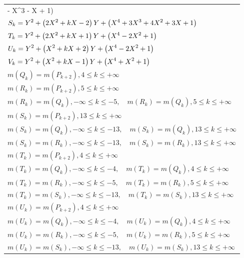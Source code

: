 \documentclass{amsart}
\begin{document}
\begin{longtable}{|l|}
 - X^3
 - X
 + 1\right) \)\\
\(\displaystyle S_k=Y^2
 + \left(2\*X^2
 + k\*X
 - 2\right) \*Y
 + \left(X^4
 + 3\*X^3
 + 4\*X^2
 + 3\*X
 + 1\right) \)\\
\(\displaystyle T_k=Y^2
 + \left(2\*X^2
 + k\*X
 + 1\right) \*Y
 + \left(X^4
 - 2\*X^2
 + 1\right) \)\\
\(\displaystyle U_k=Y^2
 + \left(X^2
 + k\*X
 + 2\right) \*Y
 + \left(X^4
 - 2\*X^2
 + 1\right) \)\\
\(\displaystyle V_k=Y^2
 + \left(X^2
 + k\*X
 - 1\right) \*Y
 + \left(X^4
 + X^2
 + 1\right) \)\\
\(\displaystyle m(Q_k) = m(P_{k
 + 2}),4 \leqslant k \leqslant +\infty\)\\
\(\displaystyle m(R_k) = m(P_{k
 + 2}),5 \leqslant k \leqslant +\infty\)\\
\(\displaystyle m(R_k) = m(Q_{k}),-\infty \leqslant k \leqslant -5,\quad m(R_k) = m(Q_{k}),5 \leqslant k \leqslant +\infty\)\\
\(\displaystyle m(S_k) = m(P_{k
 + 2}),13 \leqslant k \leqslant +\infty\)\\
\(\displaystyle m(S_k) = m(Q_{k}),-\infty \leqslant k \leqslant -13,\quad m(S_k) = m(Q_{k}),13 \leqslant k \leqslant +\infty\)\\
\(\displaystyle m(S_k) = m(R_{k}),-\infty \leqslant k \leqslant -13,\quad m(S_k) = m(R_{k}),13 \leqslant k \leqslant +\infty\)\\
\(\displaystyle m(T_k) = m(P_{k
 + 2}),4 \leqslant k \leqslant +\infty\)\\
\(\displaystyle m(T_k) = m(Q_{k}),-\infty \leqslant k \leqslant -4,\quad m(T_k) = m(Q_{k}),4 \leqslant k \leqslant +\infty\)\\
\(\displaystyle m(T_k) = m(R_{k}),-\infty \leqslant k \leqslant -5,\quad m(T_k) = m(R_{k}),5 \leqslant k \leqslant +\infty\)\\
\(\displaystyle m(T_k) = m(S_{k}),-\infty \leqslant k \leqslant -13,\quad m(T_k) = m(S_{k}),13 \leqslant k \leqslant +\infty\)\\
\(\displaystyle m(U_k) = m(P_{k
 + 2}),4 \leqslant k \leqslant +\infty\)\\
\(\displaystyle m(U_k) = m(Q_{k}),-\infty \leqslant k \leqslant -4,\quad m(U_k) = m(Q_{k}),4 \leqslant k \leqslant +\infty\)\\
\(\displaystyle m(U_k) = m(R_{k}),-\infty \leqslant k \leqslant -5,\quad m(U_k) = m(R_{k}),5 \leqslant k \leqslant +\infty\)\\
\(\displaystyle m(U_k) = m(S_{k}),-\infty \leqslant k \leqslant -13,\quad m(U_k) = m(S_{k}),13 \leqslant k \leqslant +\infty\)\\

\end{longtable}
\end{document}
